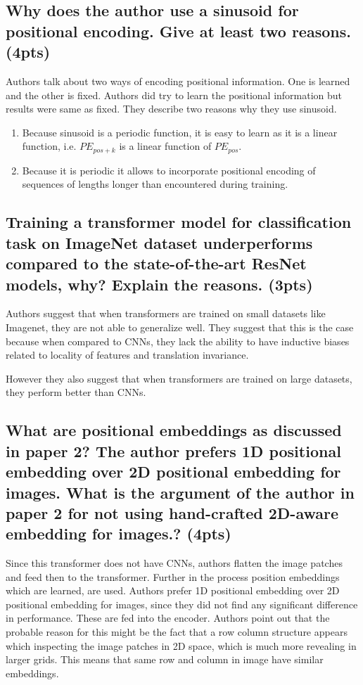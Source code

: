 \documentclass{article}
\begin{document}
\subsection{Why does the author use a sinusoid for positional encoding. Give at least two reasons. (4pts)}

Authors talk about two ways of encoding positional information. One is learned and the other is fixed. Authors did try to learn the positional information but results were same as fixed. They describe two reasons why they use sinusoid.

\begin{enumerate}
    \item Because sinusoid is a periodic function, it is easy to learn as it is a linear function, i.e. $PE_{pos+k}$ is a linear function of $PE_{pos}$.
    \item Because it is periodic it allows to incorporate positional encoding of sequences of lengths longer than encountered during training.
\end{enumerate}

\subsection{Training a transformer model for classification task on ImageNet dataset underperforms compared to the state-of-the-art ResNet models, why? Explain the reasons. (3pts)}

Authors suggest that when transformers are trained on small datasets like Imagenet, they are not able to generalize well. They suggest that this is the case because when compared to CNNs, they lack the ability to have inductive biases related to locality of features and translation invariance.

However they also suggest that when transformers are trained on large datasets, they perform better than CNNs.

\subsection{What are positional embeddings as discussed in paper 2? The author prefers 1D positional embedding over 2D positional embedding for images. What is the argument of the author in paper 2 for not using hand-crafted 2D-aware embedding for images.? (4pts) }

Since this transformer does not have CNNs, authors flatten the image patches and feed then to the transformer. Further in the process position embeddings which are learned, are used. Authors prefer 1D positional embedding over 2D positional embedding for images, since they did not find any significant difference in performance. These are fed into the encoder. Authors point out that the probable reason for this might be the fact that a row column structure appears which inspecting the image patches in 2D space, which is much more revealing in larger grids. This means that same row and column in image have similar embeddings.
\end{document}
